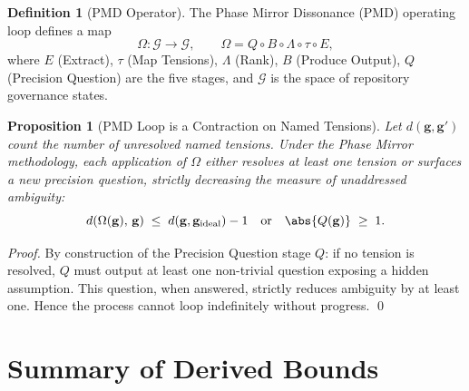 \documentclass[12pt,a4paper]{article}
\newtheorem{proposition}[theorem]{Proposition}
\theoremstyle{definition}
\newtheorem{definition}[theorem]{Definition}
\theoremstyle{remark}
\begin{document}
\begin{definition}[PMD Operator]
The Phase Mirror Dissonance (PMD) operating loop defines a map
\[
  \Omega: \mathcal{G} \to \mathcal{G}, \qquad
  \Omega = Q \circ B \circ \Lambda \circ \tau \circ E,
\]
where $E$ (Extract), $\tau$ (Map Tensions), $\Lambda$ (Rank), $B$ (Produce Output),
$Q$ (Precision Question) are the five stages, and $\mathcal{G}$ is the space of
repository governance states.
\end{definition}

\begin{proposition}[PMD Loop is a Contraction on Named Tensions]
Let $d(\mathbf{g},\mathbf{g}')$ count the number of unresolved named tensions.
Under the Phase Mirror methodology, each application of $\Omega$ either resolves at
least one tension or surfaces a new precision question, strictly decreasing the
measure of unaddressed ambiguity:
\begin{equation}
  d(\Omega(\mathbf{g}),\,\mathbf{g}) \;\le\; d(\mathbf{g},\mathbf{g}_{\text{ideal}}) - 1
  \quad\text{or}\quad
  \abs{Q(\mathbf{g})} \;\ge\; 1.
  \label{eq:contraction}
\end{equation}
\end{proposition}

\begin{proof}
By construction of the Precision Question stage $Q$: if no tension is resolved,
$Q$ must output at least one non-trivial question exposing a hidden assumption.
This question, when answered, strictly reduces ambiguity by at least one.
Hence the process cannot loop indefinitely without progress. \qed
\end{proof}

\section{Summary of Derived Bounds}
\label{sec:summary}
\end{document}
